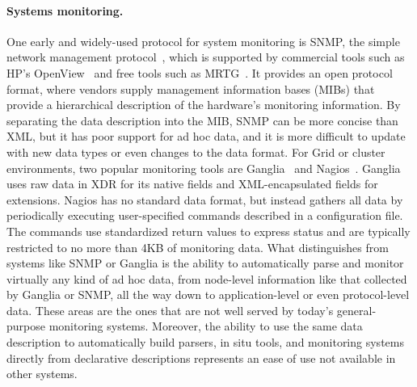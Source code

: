 \paragraph*{Systems monitoring.}
One early and widely-used protocol for system monitoring is SNMP, the
simple network management protocol~\cite{snmprfc1157}, which is
supported by commercial tools such as HP's OpenView~\cite{openview}
and free tools such as MRTG~\cite{mrtg}. It provides an open protocol
format, where vendors supply management information bases (MIBs)
that provide a hierarchical description of the hardware's monitoring
information. By separating the data description into the MIB, SNMP
can be more concise than XML, but it has poor support for ad hoc
data, and it is more difficult to update with new data types or even 
changes to the data format.
For Grid or cluster environments, two popular monitoring tools are
Ganglia~\cite{ganglia} and Nagios~\cite{nagios}.  
Ganglia uses raw data in XDR
for its native fields and XML-encapsulated fields for extensions.
Nagios has no standard data format, but instead gathers all data by
periodically executing user-specified commands described in a
configuration file. The commands use standardized return values to
express status and are typically restricted to no more than 4KB of
monitoring data.
What distinguishes \padsd{} from systems like SNMP or Ganglia is the
ability to automatically parse and monitor virtually any kind of
ad hoc data, from node-level information like that collected by
Ganglia or SNMP, all the way down to application-level or even
protocol-level data. These areas are the ones that are not well served
by today's general-purpose monitoring systems. Moreover, the ability
to use the same data description to automatically build parsers, 
in situ tools, and monitoring systems directly from declarative
descriptions represents an ease of use not
available in other systems. 


